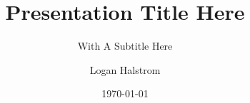 

\documentclass[aspectratio=169]{beamer}

\newcommand\runlocal{0}
\newcommand\usegrid{1}
\newcommand\filledtitle{1}
\newcommand\themecolors{0}    %
\newcommand\newfootercenter{0} %
\newcommand\footercenter{new center footer text rather than date}
\newcommand\slidebeforetitle{0} %
\newcommand\totframesinfoot{0} %
\newcommand\titletextwidth{12cm} %
\newcommand\titleleftalignfrac{0.24} %
\newcommand\titleheightfrac{0.775} %
\ifnum\runlocal=1%
\else%
    \newcommand\remote{\string~/lib/beamer/nasa}
    \usepackage{\remote/beamerthemenasa}
\fi%









\title{Presentation Title Here}
\subtitle{With A Subtitle Here}
\author{Logan Halstrom}
\date{\today}

\ifnum\runlocal=1%
    \newcommand\EGlogo{Images/EG_Logo.png}
    \newcommand\SLSpic{Images/Orion_SLS_trim.png}
\else%
    \newcommand\EGlogo{\remote/Images/EG_Logo.png}
    \newcommand\SLSpic{\remote/Images/SLS_Orange.png}
\fi%
{
\begin{textblock*}{0cm}(-0.5cm,0.5cm) %
\texttt{[image: \\EGlogo]}
\end{textblock*}

\begin{textblock*}{0cm}(0.7\textwidth,0.25cm)
\texttt{[image: \\SLSpic]}
\end{textblock*}
}

